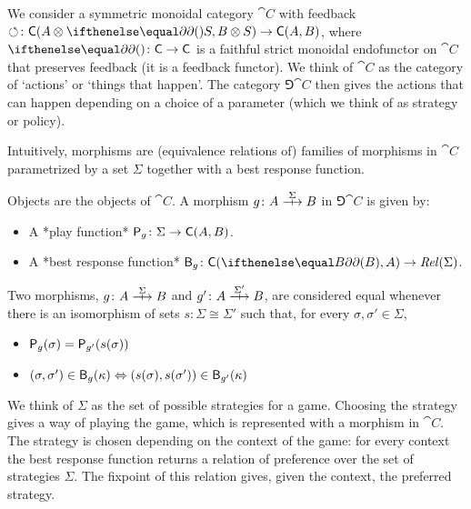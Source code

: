 We consider a symmetric monoidal category \(\cat{C}\) with feedback \(\fbk \colon \cat{C}(A \tensor \delay S, B \tensor S) \to \cat{C}(A,B) \), where \(\delay \colon \cat{C} \to \cat{C}\) is a faithful strict monoidal endofunctor on \(\cat{C}\) that preserves feedback (it is a feedback functor).
We think of \(\cat{C}\) as the category of `actions' or `things that happen'.
The category \(\Game{\cat{C}}\) then gives the actions that can happen depending on a choice of a parameter (which we think of as strategy or policy).

Intuitively, morphisms are (equivalence relations of) families of morphisms in \(\cat{C}\) parametrized by a set \(\Sigma\) together with a best response function.

\begin{definition}
  Objects are the objects of \(\cat{C}\).
  A morphism \(g \colon A \gamearrow{\Sigma} B\) in \(\Game{\cat{C}}\) is given by:
  \begin{itemize}
    \item A *play function* \(\mathsf{P}_{g} \colon \Sigma \to \mathsf{C}(A,B)\).
    \item A *best response function* \(\best{g} \colon \cat{C}(\delay[B],A) \to \rel{\Sigma}\).
  \end{itemize}
  Two morphisms, \(g \colon A \gamearrow{\Sigma} B\) and \(g' \colon A \gamearrow{\Sigma'} B\), are considered equal whenever there is an isomorphism of sets \(s \colon \Sigma \cong \Sigma'\) such that, for every \(\sigma,\sigma' \in \Sigma\),
  \begin{itemize}
    \item \(\mathsf{P}_{g}(\sigma) = \mathsf{P}_{g'}(s(\sigma))\)
    \item \((\sigma,\sigma') \in \mathsf{B}_{g}(\kappa) \Leftrightarrow (s(\sigma),s(\sigma')) \in \mathsf{B}_{g'}(\kappa) \)
  \end{itemize}
\end{definition}

We think of \(\Sigma\) as the set of possible strategies for a game.
Choosing the strategy gives a way of playing the game, which is represented with a morphism in \(\cat{C}\).
The strategy is chosen depending on the context of the game: for every context the best response function returns a relation of preference over the set of strategies \(\Sigma\).
The fixpoint of this relation gives, given the context, the preferred strategy.


